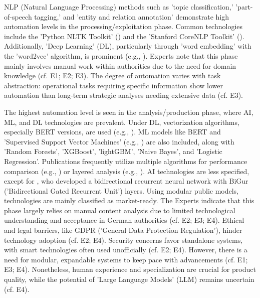 \documentclass[10pt]{article}
\begin{document}
NLP (Natural Language Processing) methods such as 'topic classification,' 'part-of-speech tagging,' and 'entity and relation annotation' demonstrate high automation levels in the processing/exploitation phase. Common technologies include the 'Python NLTK Toolkit' (\cite{Hubbard.2022}) and the 'Stanford CoreNLP Toolkit' (\cite{Middleton.2020}). Additionally, 'Deep Learning' (DL), particularly through 'word embedding' with the 'word2vec' algorithm, is prominent (e.g., \cite{Bai.2020}). Experts note that this phase mainly involves manual work within authorities due to the need for domain knowledge (cf. E1; E2; E3). The degree of automation varies with task abstraction: operational tasks requiring specific information show lower automation than long-term strategic analyses needing extensive data (cf. E3).

The highest automation level is seen in the analysis/production phase, where AI, ML, and DL technologies are prevalent. Under DL, vectorization algorithms, especially BERT versions, are used (e.g., \cite{Ma.2022}). ML models like BERT and 'Supervised Support Vector Machines' (e.g., \cite{Iorga.2020}) are also included, along with 'Random Forests', 'XGBoost', 'lightGBM', 'Naive Bayes', and 'Logistic Regression'. Publications frequently utilize multiple algorithms for performance comparison (e.g., \cite{Tao.2023}) or layered analysis (e.g., \cite{Yang.2022}). AI technologies are less specified, except for \textcite{Dale.2023}, who developed a bidirectional recurrent neural network with BiGur ('Bidirectional Gated Recurrent Unit') layers. Using modular public models, technologies are mainly classified as market-ready. The Experts indicate that this phase largely relies on manual content analysis due to limited technological understanding and acceptance in German authorities (cf. E2; E3; E4). Ethical and legal barriers, like GDPR ('General Data Protection Regulation'), hinder technology adoption (cf. E2; E4). Security concerns favor standalone systems, with smart technologies often used unofficially (cf. E2; E4). However, there is a need for modular, expandable systems to keep pace with advancements (cf. E1; E3; E4). Nonetheless, human experience and specialization are crucial for product quality, while the potential of 'Large Language Models' (LLM) remains uncertain (cf. E4).
\end{document}
